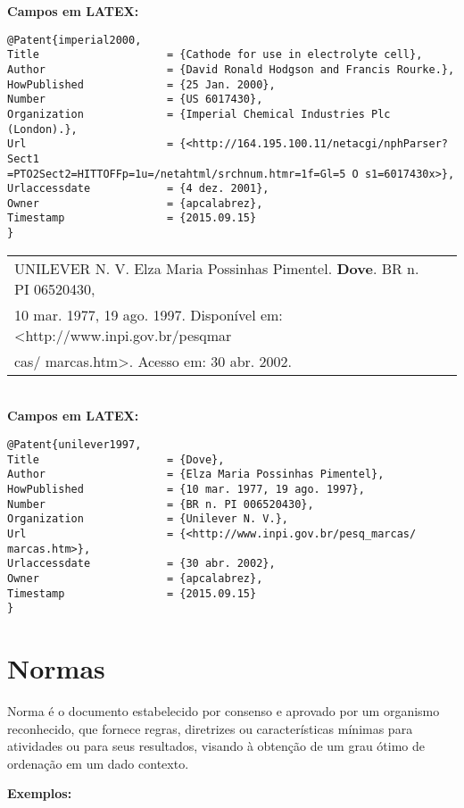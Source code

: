 \textbf{Campos em LATEX:} 

\begin{verbatim}
@Patent{imperial2000,
Title                    = {Cathode for use in electrolyte cell},
Author                   = {David Ronald Hodgson and Francis Rourke.},
HowPublished             = {25 Jan. 2000},
Number                   = {US 6017430},
Organization             = {Imperial Chemical Industries Plc (London).},
Url                      = {<http://164.195.100.11/netacgi/nphParser?Sect1
=PTO2Sect2=HITTOFFp=1u=/netahtml/srchnum.htmr=1f=Gl=5 O s1=6017430x>},
Urlaccessdate            = {4 dez. 2001},
Owner                    = {apcalabrez},
Timestamp                = {2015.09.15}
}

\end{verbatim}


\begin{tabular}{|l|c|} \hline
UNILEVER N. V. Elza Maria Possinhas Pimentel. \textbf{Dove}. BR n. PI 06520430,\\ 10 mar. 1977, 19 ago. 1997. Disponível em: <http://www.inpi.gov.br/pesqmar\\cas/ marcas.htm>. Acesso em: 30 abr.
2002. 
	\\\hline
\end{tabular} \\

\textbf{Campos em LATEX:} 

\begin{verbatim}
@Patent{unilever1997,
Title                    = {Dove},
Author                   = {Elza Maria Possinhas Pimentel},
HowPublished             = {10 mar. 1977, 19 ago. 1997},
Number                   = {BR n. PI 006520430},
Organization             = {Unilever N. V.},
Url                      = {<http://www.inpi.gov.br/pesq_marcas/
marcas.htm>},
Urlaccessdate            = {30 abr. 2002},
Owner                    = {apcalabrez},
Timestamp                = {2015.09.15}
}
\end{verbatim}

\section{Normas}

Norma é o documento estabelecido por consenso e aprovado por um organismo reconhecido, que fornece regras, diretrizes ou características mínimas para atividades ou para seus resultados, visando à obtenção de um grau ótimo de ordenação em um dado contexto.

\textbf{Exemplos:} \\

